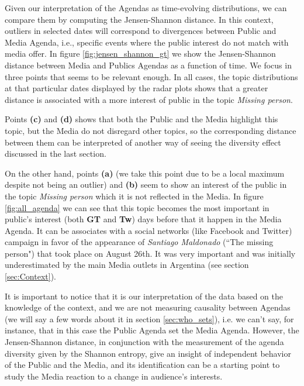 \documentclass{bmcart}
\begin{document}
\par Given our interpretation of the Agendas as time-evolving distributions, we can  compare them by computing the Jensen-Shannon distance. In this context, outliers in selected dates will correspond to divergences between Public and Media Agenda, i.e., specific events where the public interest do not match with media offer.
In figure \ref{fig:jensen_shannon_gt} we show the Jensen-Shannon distance between Media and Publics Agendas as a function of time. We focus in three points that seems to be relevant enough. In all cases, the topic distributions at that particular dates displayed by  the radar plots shows that a greater distance is associated with a more interest of public in the topic \emph{Missing person}. 
\par Points \textbf{(c)} and \textbf{(d)} shows that both the Public and the Media highlight this topic, but the Media do not disregard other topics, so the corresponding distance between them can be interpreted  of another way of seeing the diversity effect discussed in the last section.
\par On the other hand,  points \textbf{(a)} (we take this point due to be a local maximum despite not being an outlier) and \textbf{(b)} seem to show an interest of the public in the topic \emph{Missing person} which it is not reflected in the Media.  In figure \ref{fig:all_agenda} we can see that this topic becomes the most important in public's interest (both \textbf{GT} and \textbf{Tw}) days before that  it happen in the Media Agenda. It can be associates  with a social networks (like Facebook and Twitter) campaign  in favor  of the appearance of \emph{Santiago Maldonado} (``The missing person") that took place on  August 26th. It was very important and was initially underestimated by the main Media outlets in Argentina (see section \ref{sec:Context}). 
\par It is important to notice that it is our interpretation of the data based on the knowledge of the context, and  we are not measuring causality between Agendas (we will say a few words about it in section \ref{sec:who_sets}), i.e. we can't say, for instance, that in this case the Public Agenda set the Media Agenda. 
However, the Jensen-Shannon distance, in conjunction with the measurement of the agenda diversity given by the Shannon entropy, give an insight of independent behavior of the Public and the Media, and its identification can be a starting point to study the Media reaction to a change in audience's interests.
 
\end{document}
